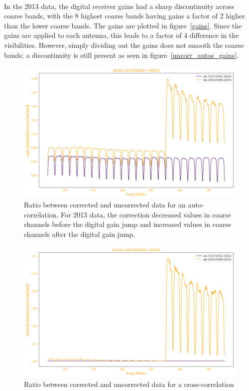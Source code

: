 \documentclass[11pt]{article}
\begin{document}
\paragraph{}In the 2013 data, the digital receiver gains had a sharp discontinuity across coarse bands, with the 8 highest coarse bands having gains a factor of 2 higher than the lower coarse bands. The gains are plotted in figure~\ref{gains}. Since the gains are applied to each antenna, this leads to a factor of 4 difference in the visibilities. However, simply dividing out the gains does not smooth the coarse bands; a discontinuity is still present as seen in figure~\ref{uncorr_autos_gains}. 
\begin{figure}
\centering{}
\includegraphics[width=135mm]{auto_ratio.png}
\caption{Ratio between corrected and uncorrected data for an auto-correlation. For 2013 data, the correction decreased values in coarse channels before the digital gain jump and increased values in coarse channels after the digital gain jump. \label{auto_ratio}}
\end{figure}
\begin{figure}
\centering{}
\includegraphics[width=135mm]{cross_ratio.png}
\caption{Ratio between corrected and uncorrected data for a cross-correlation\label{cross_ratio}}
\end{figure}
\end{document}
